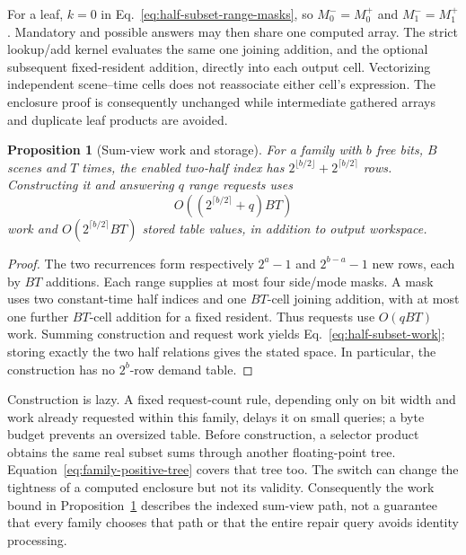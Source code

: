 \documentclass[11pt]{article}
\newtheorem{proposition}{Proposition}
\begin{document}
For a leaf, $k=0$ in Eq.~\eqref{eq:half-subset-range-masks}, so $M_0^-=M_0^+$ and $M_1^-=M_1^+$. Mandatory and possible answers may then share one computed array. The strict lookup/add kernel evaluates the same one joining addition, and the optional subsequent fixed-resident addition, directly into each output cell. Vectorizing independent scene--time cells does not reassociate either cell's expression. The enclosure proof is consequently unchanged while intermediate gathered arrays and duplicate leaf products are avoided.

\begin{proposition}[Sum-view work and storage]\label{prop:factorized-sum-work}
For a family with $b$ free bits, $B$ scenes and $T$ times, the enabled two-half index has $2^{\lfloor b/2\rfloor}+2^{\lceil b/2\rceil}$ rows. Constructing it and answering $q$ range requests uses
\begin{equation}
O\!\left((2^{\lceil b/2\rceil}+q)BT\right)
\label{eq:half-subset-work}
\end{equation}
work and $O(2^{\lceil b/2\rceil}BT)$ stored table values, in addition to output workspace.
\end{proposition}
\begin{proof}
The two recurrences form respectively $2^a-1$ and $2^{b-a}-1$ new rows, each by $BT$ additions. Each range supplies at most four side/mode masks. A mask uses two constant-time half indices and one $BT$-cell joining addition, with at most one further $BT$-cell addition for a fixed resident. Thus requests use $O(qBT)$ work. Summing construction and request work yields Eq.~\eqref{eq:half-subset-work}; storing exactly the two half relations gives the stated space. In particular, the construction has no $2^b$-row demand table.
\end{proof}

Construction is lazy. A fixed request-count rule, depending only on bit width and work already requested within this family, delays it on small queries; a byte budget prevents an oversized table. Before construction, a selector product obtains the same real subset sums through another floating-point tree. Equation~\eqref{eq:family-positive-tree} covers that tree too. The switch can change the tightness of a computed enclosure but not its validity. Consequently the work bound in Proposition~\ref{prop:factorized-sum-work} describes the indexed sum-view path, not a guarantee that every family chooses that path or that the entire repair query avoids identity processing.
\end{document}
